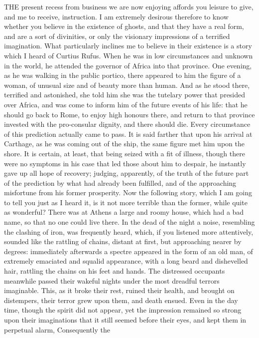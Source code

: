 THE present recess from business we are now enjoying affords you leisure
to give, and me to receive, instruction. I am extremely desirous therefore
to know whether you believe in the existence of ghosts, and that they have
a real form, and are a sort of divinities, or only the visionary
impressions of a terrified imagination. What particularly inclines me to
believe in their existence is a story which I heard of Curtius Rufus. When
he was in low circumstances and unknown in the world, he attended the
governor of Africa into that province. One evening, as he was walking in
the public portico, there appeared to him the figure of a woman, of
unusual size and of beauty more than human. And as he stood there,
terrified and astonished, she told him she was the tutelary power that
presided over Africa, and was come to inform him of the future events of
his life: that he should go back to Rome, to enjoy high honours there, and
return to that province invested with the pro-consular dignity, and there
should die. Every circumstance of this prediction actually came to pass.
It is said farther that upon his arrival at Carthage, as he was coming out
of the ship, the same figure met him upon the shore. It is certain, at
least, that being seized with a fit of illness, though there were no
symptoms in his case that led those about him to despair, he instantly
gave up all hope of recovery; judging, apparently, of the truth of the
future part of the prediction by what had already been fulfilled, and of
the approaching misfortune from his former prosperity. Now the following
story, which I am going to tell you just as I heard it, is it not more
terrible than the former, while quite as wonderful? There was at Athens a
large and roomy house, which had a bad name, so that no one could live
there. In the dead of the night a noise, resembling the clashing of iron,
was frequently heard, which, if you listened more attentively, sounded
like the rattling of chains, distant at first, but approaching nearer by
degrees: immediately afterwards a spectre appeared in the form of an old
man, of extremely emaciated and squalid appearance, with a long beard and
dishevelled hair, rattling the chains on his feet and hands. The
distressed occupants meanwhile passed their wakeful nights under the most
dreadful terrors imaginable. This, as it broke their rest, ruined their
health, and brought on distempers, their terror grew upon them, and death
ensued. Even in the day time, though the spirit did not appear, yet the
impression remained so strong upon their imaginations that it still seemed
before their eyes, and kept them in perpetual alarm, Consequently the
